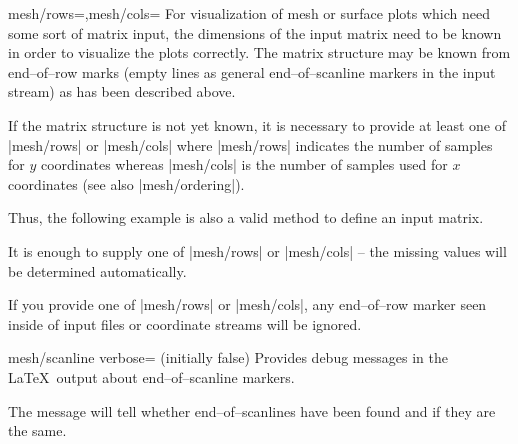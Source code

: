 \begin{pgfplotskeylist}{mesh/rows=,mesh/cols=}
	For visualization of mesh or surface plots which need some sort of matrix input, the dimensions of the input matrix need to be known in order to visualize the plots correctly. The matrix structure may be known from end--of--row marks (empty lines as general end--of--scanline markers in the input stream) as has been described above.

	If the matrix structure is not yet known, it is necessary to provide at least one of |mesh/rows| or |mesh/cols| where |mesh/rows| indicates the number of samples for $y$ coordinates whereas |mesh/cols| is the number of samples used for $x$ coordinates (see also |mesh/ordering|). 

	Thus, the following example is also a valid method to define an input matrix.
\begin{codeexample}[]
\end{codeexample}

	It is enough to supply one of |mesh/rows| or |mesh/cols| -- the missing values will be determined automatically.
	
	If you provide one of |mesh/rows| or |mesh/cols|, any end--of--row marker seen inside of input files or coordinate streams will be ignored.

\end{pgfplotskeylist}

\begin{pgfplotskeylist}{mesh/scanline verbose= (initially false)}
	Provides debug messages in the \LaTeX\ output about end--of--scanline markers.

	The message will tell whether end--of--scanlines have been found and if they are the same.
\end{pgfplotskeylist}

